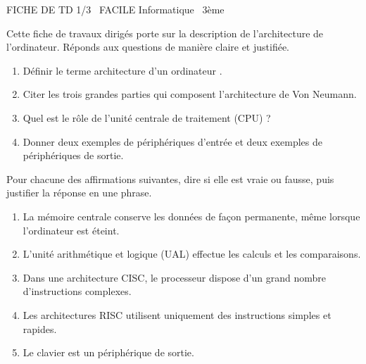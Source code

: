 \documentclass[11pt]{article}
\begin{document}
\begin{tcolorbox}[enhanced,colback=popink,colframe=popink,arc=10pt,boxrule=0pt,left=12pt,right=12pt,top=9pt,bottom=9pt]
{\color{white}\popxbold\small FICHE DE TD 1/3 \textbullet\ FACILE \hfill Informatique \textbullet\ 3ème\par}
\end{tcolorbox}
\vspace{4pt}
Cette fiche de travaux dirigés porte sur la description de l'architecture de l'ordinateur. Réponds aux questions de manière claire et justifiée.

\begin{exercice}
\begin{enumerate}
  \item Définir le terme \og architecture d'un ordinateur \fg{}.
  \item Citer les trois grandes parties qui composent l'architecture de Von Neumann.
  \item Quel est le rôle de l'unité centrale de traitement (CPU) ?
  \item Donner deux exemples de périphériques d'entrée et deux exemples de périphériques de sortie.
\end{enumerate}
\end{exercice}

\begin{exercice}
Pour chacune des affirmations suivantes, dire si elle est vraie ou fausse, puis justifier la réponse en une phrase.
\begin{enumerate}
  \item La mémoire centrale conserve les données de façon permanente, même lorsque l'ordinateur est éteint.
  \item L'unité arithmétique et logique (UAL) effectue les calculs et les comparaisons.
  \item Dans une architecture CISC, le processeur dispose d'un grand nombre d'instructions complexes.
  \item Les architectures RISC utilisent uniquement des instructions simples et rapides.
  \item Le clavier est un périphérique de sortie.
\end{enumerate}
\end{exercice}
\end{document}
